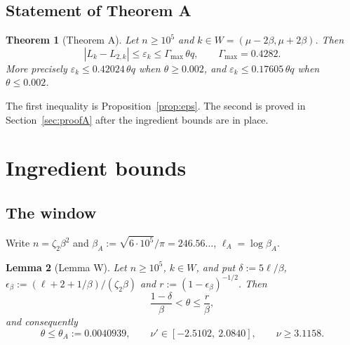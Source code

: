 \documentclass[11pt]{amsart}
\newtheorem{theorem}{Theorem}[section]
\newtheorem{lemma}[theorem]{Lemma}
\theoremstyle{definition}
\theoremstyle{remark}
\numberwithin{equation}{section}
\begin{document}
\subsection{Statement of Theorem A}
\begin{theorem}[Theorem A]\label{thm:A}
Let $n\ge10^5$ and $k\in W=(\mu-2\beta,\mu+2\beta)$. Then
\[
  |L_k-L_{2,k}|\le\varepsilon_k\le\Gamma_{\max}\,\theta q,\qquad \Gamma_{\max}=0.4282 .
\]
More precisely $\varepsilon_k\le0.42024\,\theta q$ when $\theta\ge0.002$, and $\varepsilon_k\le0.17605\,\theta q$ when $\theta\le0.002$.
\end{theorem}

The first inequality is Proposition~\ref{prop:eps}. The second is proved in Section~\ref{sec:proofA} after the ingredient bounds are in
place.

\section{Ingredient bounds}\label{sec:ingredients}

\subsection{The window}
Write $n=\zeta_2\beta^2$ and $\beta_A:=\sqrt{6\cdot10^5}/\pi=246.56\ldots$, $\ell_A=\log\beta_A$.

\begin{lemma}[Lemma W]\label{lem:W}
Let $n\ge10^5$, $k\in W$, and put $\delta:=5\ell/\beta$, $\epsilon_\beta:=(\ell+2+1/\beta)/(\zeta_2\beta)$ and $r:=(1-\epsilon_\beta)^{-1/2}$. Then
\[
  \frac{1-\delta}{\beta}<\theta\le\frac r\beta,
\]
and consequently
\[
  \theta\le\theta_A:=0.0040939,\qquad \nu'\in[-2.5102,\ 2.0840],\qquad \nu\ge3.1158 .
\]
\end{lemma}
\end{document}

